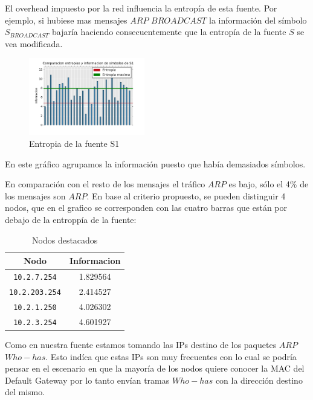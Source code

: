 El overhead impuesto por la red influencia la entropía de esta fuente.
Por ejemplo, si hubiese mas mensajes $ARP$ $BROADCAST$ la información del símbolo $S_{BROADCAST}$ bajaría haciendo consecuentemente que la entropía de la fuente $S$ se vea modificada.

\begin{figure}[h]
  \centering
    \includegraphics[width=0.45\textwidth]{grafico2-red-labos.png}
  \caption{Entropia de la fuente S1}
  \label{entropia-s1}
\end{figure}
En este gráfico agrupamos la información puesto que había demasiados símbolos.

En comparación con el resto de los mensajes el tráfico $ARP$ es bajo, sólo el 4\% de los mensajes son $ARP$. En base al criterio propuesto, se pueden distinguir 4 nodos, que en el grafico se corresponden con las cuatro barras que están por debajo de la entroppía de la fuente:   

    \begin{table}[ht]\begin{center}
      \begin{tabular}{|c|c|}
      \hline
      \textbf{Nodo} & \textbf{Informacion} \\ \hline
      \texttt{10.2.7.254}& 1.829564 \\ \hline
      \texttt{10.2.203.254}& 2.414527 \\ \hline
      \texttt{10.2.1.250}& 4.026302 \\ \hline
      \texttt{10.2.3.254}& 4.601927 \\ \hline
      \end{tabular}
      \caption{Nodos destacados}
      \label{Nodos-destacados}
    \end{center}\end{table}

Como en nuestra fuente estamos tomando las IPs destino de los paquetes $ARP$ $Who-has$. Esto indíca que estas IPs son muy frecuentes con lo cual se podría pensar en el escenario en que la mayoría de los nodos quiere conocer la MAC del Default Gateway por lo tanto envían tramas $Who-has$ con la dirección destino del mismo.

